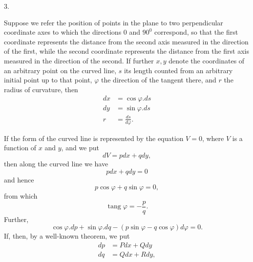 \par{}
\begin{center}3.\end{center}
\noindent\hspace*{1.2em}Suppose we refer the position of points in the plane to two perpendicular coordinate axes to which the directions $0$ and $90^{0}$ correspond, so that the first coordinate represents the distance from the second axis measured in the direction of the first, while the second coordinate represents the distance from the first axis measured in the direction of the second. If further $x,y$ denote the coordinates of an arbitrary point on the curved line, $s$ its length counted from an arbitrary initial point up to that point, $\varphi$ the direction of the tangent there, and $r$ the radius of curvature, then
\[
\begin{aligned}
dx&=\cos\varphi.ds\\
dy&=\sin\varphi.ds\\
r&=\frac{ds}{d\varphi}.
\end{aligned}
\]

If the form of the curved line is represented by the equation $V=0$, where $V$ is a function of $x$ and $y$, and we put
\[
dV=pdx+qdy,
\]
then along the curved line we have
\[
pdx+qdy=0
\]
and hence
\[
p\cos\varphi+q\sin\varphi=0,
\]
from which
\[
\operatorname{tang}\varphi=-\frac pq.
\]
Further,
\[
\cos\varphi.dp+\sin\varphi.dq-(p\sin\varphi-q\cos\varphi)d\varphi=0.
\]
If, then, by a well-known theorem, we put
\[
\begin{aligned}
dp&=Pdx+Qdy\\
dq&=Qdx+Rdy,
\end{aligned}
\]
